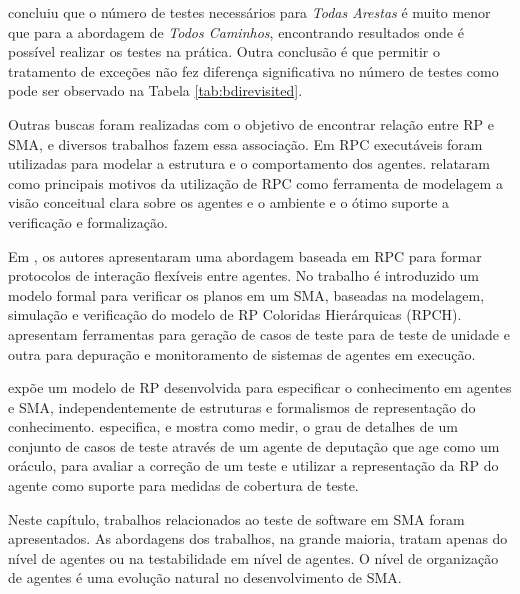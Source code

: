 \cite{winikoff2017bdi} concluiu que o número de testes necessários para \textit{Todas Arestas} é muito menor que para a abordagem de \textit{Todos Caminhos}, encontrando resultados onde é possível realizar os testes na prática. Outra conclusão é que permitir o tratamento de exceções não fez diferença significativa no número de testes como pode ser observado na Tabela \ref{tab:bdirevisited}.


Outras buscas foram realizadas com o objetivo de encontrar relação entre RP e SMA, e diversos trabalhos fazem essa associação. Em \cite{kohler2001modelling} RPC executáveis foram utilizadas para modelar a estrutura e o comportamento dos agentes. \citet{weyns2002colored} relataram como principais motivos da utilização de RPC como ferramenta de modelagem a visão conceitual clara sobre os agentes e o ambiente e o ótimo suporte a verificação e formalização. 

Em \cite{bai2004colored}, os autores apresentaram uma abordagem baseada em RPC para formar protocolos de interação flexíveis entre agentes. No trabalho \cite{de2004formal} é introduzido um modelo formal para verificar os planos em um SMA, baseadas na modelagem, simulação e verificação do modelo de RP Coloridas Hierárquicas (RPCH). \cite{poutakidis2009debugging} apresentam ferramentas para geração de casos de teste para de teste de unidade e outra para depuração e monitoramento de sistemas de agentes em execução. 

\citet{goncalves2010approach} expõe um modelo de RP desenvolvida para especificar o conhecimento em agentes e SMA, independentemente de estruturas e formalismos de representação do conhecimento. \cite{miller2011test} especifica, e mostra como medir, o grau de detalhes de um conjunto de casos de teste através de um agente de deputação que age como um oráculo, para avaliar a correção de um teste e utilizar a representação da RP do agente como suporte para medidas de cobertura de teste.

Neste capítulo, trabalhos relacionados ao teste de software em SMA foram apresentados. As abordagens dos trabalhos, na grande maioria, tratam apenas do nível de agentes ou na testabilidade em nível de agentes. O nível de organização de agentes é uma evolução natural no desenvolvimento de SMA.